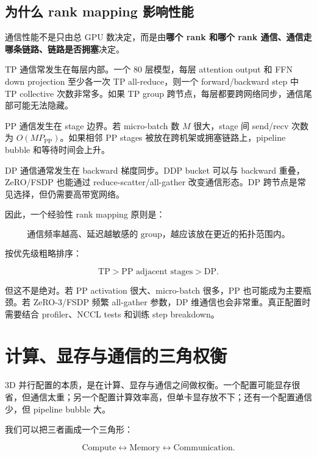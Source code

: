 \subsection{为什么 rank mapping 影响性能}
\label{subsec:why-rank-mapping-affects-performance}

通信性能不是只由总 GPU 数决定，而是由\textbf{哪个 rank 和哪个 rank 通信、通信走哪条链路、链路是否拥塞}决定。

TP 通信常发生在每层内部。一个 80 层模型，每层 attention output 和 FFN down projection 至少各一次 TP all-reduce，则一个 forward/backward step 中 TP collective 次数非常多。如果 TP group 跨节点，每层都要跨网络同步，通信尾部可能无法隐藏。

PP 通信发生在 stage 边界。若 micro-batch 数 $M$ 很大，stage 间 send/recv 次数为 $O(MP_{\mathrm{PP}})$。如果相邻 PP stages 被放在跨机架或拥塞链路上，pipeline bubble 和等待时间会上升。

DP 通信通常发生在 backward 梯度同步。DDP bucket 可以与 backward 重叠，ZeRO/FSDP 也能通过 reduce-scatter/all-gather 改变通信形态。DP 跨节点是常见选择，但仍需要高带宽网络。

因此，一个经验性 rank mapping 原则是：

\[
\text{通信频率越高、延迟越敏感的 group，越应该放在更近的拓扑范围内。}
\]

按优先级粗略排序：

\[
\text{TP}
>
\text{PP adjacent stages}
>
\text{DP}.
\]

但这不是绝对。若 PP activation 很大、micro-batch 很多，PP 也可能成为主要瓶颈。若 ZeRO-3/FSDP 频繁 all-gather 参数，DP 维通信也会非常重。真正配置时需要结合 profiler、NCCL tests 和训练 step breakdown。

\section{计算、显存与通信的三角权衡}
\label{sec:compute-memory-communication-triangle}

3D 并行配置的本质，是在计算、显存与通信之间做权衡。一个配置可能显存很省，但通信太重；另一个配置计算效率高，但单卡显存放不下；还有一个配置通信少，但 pipeline bubble 大。

我们可以把三者画成一个三角形：

\[
\text{Compute}
\leftrightarrow
\text{Memory}
\leftrightarrow
\text{Communication}.
\]

